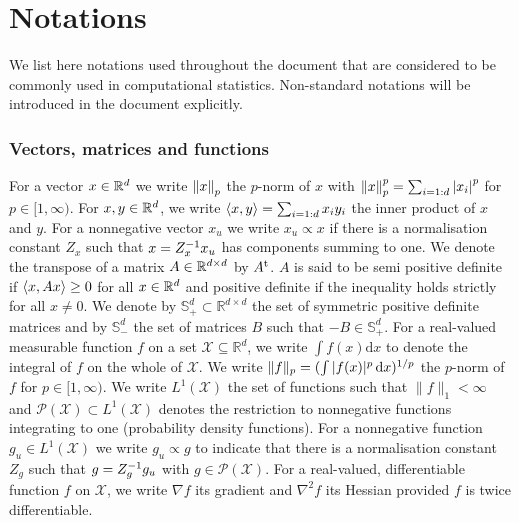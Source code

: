 
\chapter*{Notations}
\setcounter{page}{1}

We list here notations used throughout the document that are considered to be commonly used in computational statistics. Non-standard notations will be introduced in the document explicitly.

\subsection*{Vectors, matrices and functions} 
For a vector $x\in\mathbb R^{d}$ we write $\left\|x\right\|_{p}$ the $p$-norm of $x$ with $\left\|x\right\|_{p}^{p}=\sum_{i=1:d}\left|x_{i}\right|^{p}$ for $p\in[1,\infty)$. 
For $x,y\in\mathbb R^{d}$, we write $\left\langle x,y \right\rangle=\sum_{i=1:d}x_{i}y_{i}$ the inner product of $x$ and $y$. For a nonnegative vector $x_u$ we write $x_u\propto x$ if there is a normalisation constant $Z_x$ such that $x=Z_x^{-1} x_u$ has components summing to one.
We denote the transpose of a matrix $A\in\mathbb R^{d\times d}$ by $A^\mathrm{t}$. $A$ is said to be semi positive definite if $\left\langle x,Ax \right\rangle\ge 0$ for all $x\in\mathbb R^{d}$ and positive definite if the inequality holds strictly for all $x\neq 0$. We denote by $\mathbb S_+^{d}\subset \mathbb R^{d\times d}$ the set of symmetric positive definite matrices and by $\mathbb S_-^{d}$ the set of matrices $B$ such that $-B\in\mathbb S_+^{d}$.
For a real-valued measurable function $f$ on a set $\mathcal X\subseteq \mathbb R^{d}$, we write $\int f(x)\mathrm d{x}$ to denote the integral of $f$ on the whole of $\mathcal X$. We write $\|f\|_{p}=(\int |f(x)|^{p}\,\mathrm{d} x)^{1/p}$ the $p$-norm of $f$ for $p\in[1,\infty)$. 
We write $L^{1}(\mathcal X)$ the set of functions such that $\|f\|_{1}<\infty$ and $\mathcal P(\mathcal X) \subset L^{1}(\mathcal X)$ denotes the restriction to nonnegative functions integrating to one (probability density functions). For a nonnegative function $g_u\in  L^{1}(\mathcal X)$ we write $g_u\propto g$ to indicate that there is a normalisation constant $Z_g$ such that $g=Z_g^{-1} g_u$ with $g\in\mathcal P(\mathcal X)$.  
For a real-valued, differentiable function $f$ on $\mathcal X$, we write $\nabla f$ its gradient and $\nabla^{2} f$ its Hessian provided $f$ is twice differentiable. 
%
